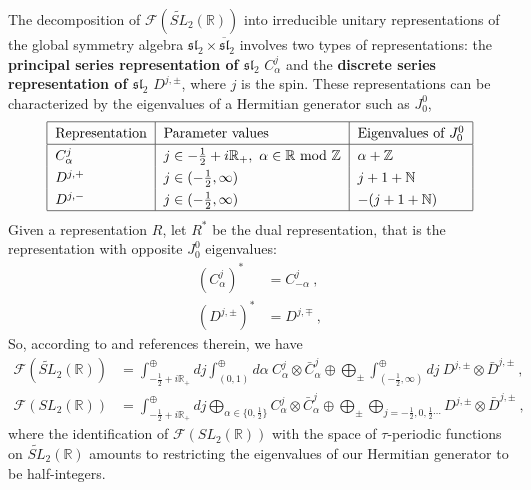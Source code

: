 \documentclass[12pt,a4paper,notitlepage]{report}
\numberwithin{equation}{section}
\theoremstyle{break}
\begin{document}
The decomposition of $\mathcal{F}(\widetilde{SL}_2(\mathbb{R}))$ into irreducible unitary representations of the global symmetry algebra $\mathfrak{sl}_2\times \overline{\mathfrak{sl}}_2$ involves two types of representations: the \textbf{\boldmath principal series representation of $\mathfrak{sl}_2$} $C^j_\alpha$ and the \textbf{\boldmath discrete series representation of $\mathfrak{sl}_2$} $D^{j,\pm}$, where $j$ is the spin. 
These representations can be characterized by the eigenvalues of a Hermitian generator such as $J_0^0$,
\begin{align} 
\renewcommand{\arraystretch}{1.3}
\begin{tabular}{|l|l|l|}
  \hline
Representation & Parameter values & Eigenvalues of $J_0^0$
\\
\hline 
$C^j_\alpha$  & $j\in -\tfrac12+i{\mathbb{R}}_+,\ \alpha\in{\mathbb{R}}\ \text{mod}\ {\mathbb{Z}}$ &  $\alpha + {\mathbb{Z}}$ 
\\
$D^{j,+}$ & $j\in(-\tfrac12,\infty)$ & $j+1+{\mathbb{N}}$
\\
$D^{j,-}$ & $j\in(-\tfrac12,\infty)$ & $-(j+1+{\mathbb{N}})$
\\
\hline 
 \end{tabular}
\label{rpe}
\end{align}
Given a representation $R$, let $R^*$ be the dual representation, that is the representation with opposite $J_0^0$ eigenvalues:
\begin{align}
 (C^j_\alpha)^* &= C^j_{-\alpha} \ , 
\\
 (D^{j,\pm})^* &= D^{j,\mp}\ ,
\end{align}
So, according to \cite{rib09} and references therein, we have
\begin{align}
 \mathcal{F}(\widetilde{SL}_2(\mathbb{R})) &= \int^\oplus_{-\frac12+i{\mathbb{R}}_+} dj \int^\oplus_{(0,1)} d\alpha\ C^j_\alpha \otimes \bar{C}^j_{\alpha} \oplus \bigoplus_\pm \int^\oplus_{(-\frac12,\infty)} dj\ D^{j,\pm}\otimes \bar{D}^{j,\pm} \ ,
\label{fst}
\\
 \mathcal{F}(SL_2(\mathbb{R})) &= \int^\oplus_{-\frac12+i{\mathbb{R}}_+} dj \bigoplus_{\alpha\in\{0,\frac12\}} C^j_\alpha \otimes \bar{C}^j_{\alpha} \oplus \bigoplus_\pm \bigoplus_{j=-\frac12, 0,\frac12 \cdots} D^{j,\pm}\otimes \bar{D}^{j,\pm} \ ,
\end{align}
where the identification of $\mathcal{F}(SL_2(\mathbb{R}))$ with the space of $\tau$-periodic functions on $\widetilde{SL}_2(\mathbb{R})$ amounts to restricting the eigenvalues of our Hermitian generator to be half-integers.
\end{document}

